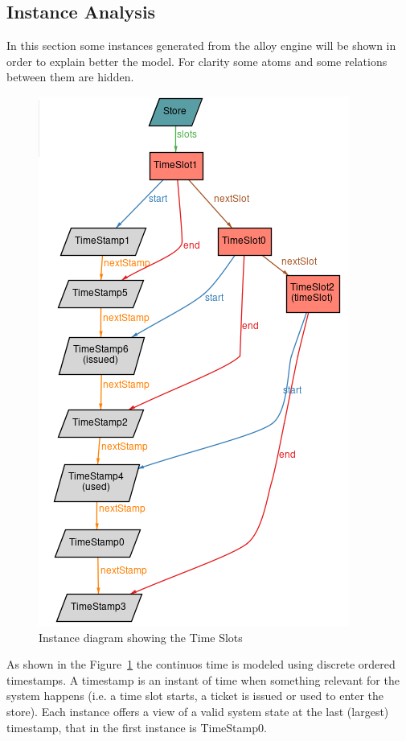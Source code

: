 \subsection{Instance Analysis}
In this section some instances generated from the alloy engine will be shown in order to explain better the model.
For clarity some atoms and some relations between them are hidden. 
\begin{figure}[H]
    \hspace*{3.0cm}
    \includegraphics[scale=1.0]{Images/alloy_1_slots.png}
    \caption{\label{fig:Alloy_1}Instance diagram showing the Time Slots}
\end{figure}    

As shown in the Figure~\ref{fig:Alloy_1} the continuos time is modeled using discrete ordered timestamps. A timestamp is an instant of time when something relevant for the system happens (i.e. a time slot starts, a ticket is issued or used to enter the store). Each instance offers a view of a valid system state at the last (largest) timestamp, that in the first instance is TimeStamp0.

